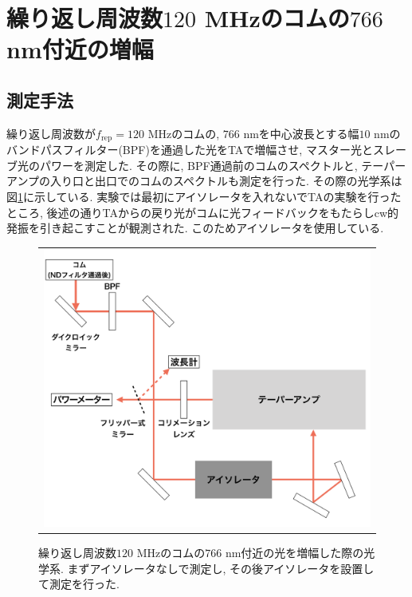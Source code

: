 \documentclass[uplatex, dvipdfmx, a4paper, report, papersize, 11pt]{jsbook}
\begin{document}
\newpage
\section{繰り返し周波数$120$ MHzのコムの$766$ nm付近の増幅}
\subsection{測定手法}
繰り返し周波数が$f_{\mathrm{rep}} = 120$ MHzのコムの, $766$ nmを中心波長とする幅$10$ nmのバンドパスフィルター(BPF)を通過した光をTAで増幅させ, マスター光とスレーブ光のパワーを測定した. その際に, BPF通過前のコムのスペクトルと, テーパーアンプの入り口と出口でのコムのスペクトルも測定を行った. その際の光学系は図\ref{760_amp_diagram}に示している. 実験では最初にアイソレータを入れないでTAの実験を行ったところ, 後述の通りTAからの戻り光がコムに光フィードバックをもたらしcw的発振を引き起こすことが観測された. このためアイソレータを使用している.

\begin{figure}[htpb]
  \centering
    \begin{tabular}{c}
      \begin{minipage}{1\hsize}
        \centering
          \includegraphics[keepaspectratio,  scale=0.4,  angle=0]
                          {figures/chapter4/760_amp_diagram.png}
                          \caption{繰り返し周波数$120$ MHzのコムの$766$ nm付近の光を増幅した際の光学系. まずアイソレータなしで測定し, その後アイソレータを設置して測定を行った. }
                          \label{760_amp_diagram}
      \end{minipage}
    \end{tabular}
\end{figure}
\end{document}
